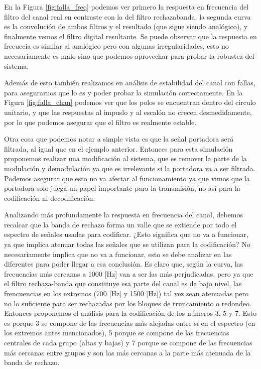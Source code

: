 En la Figura \ref{fig:falla_freq} podemos ver primero la respuesta en frecuencia del filtro del canal real en contraste con la del filtro rechazabanda, la segunda curva es la convolución de ambos filtros y el resultado (que sigue siendo analógico), y finalmente vemos el filtro digital resultante. Se puede observar que la respuesta en frecuecia es similar al analógico pero con algunas irregularidades, esto no necesariamente es malo sino que podemos aprovechar para probar la robustez del sistema.

\pagebreak

Además de esto también realizamos en análisis de estabilidad del canal con fallas, para asegurarnos que lo es y poder probar la simulación correctamente. En la Figura \ref{fig:falla_chan} podemos ver que los polos se encuentran dentro del circulo unitario, y que las respuestas al impuslo y al escalón no crecen desmedidamente, por lo que podemos asegurar que el filtro es realmente estable.

Otra cosa que podemos notar a simple vista es que la señal portadora será filtrada, al igual que en el ejemplo anterior. Entonces para esta simulación proponemos realizar una modificación al sistema, que es remover la parte de la modulación y demodulación ya que es irrelevante si la portadora va a ser filtrada. Podemos asegurar que esto no va afectar al funcionamiento ya que vimos que la portadora solo juega un papel importante para la transmisión, no así para la codificación ni decodificación.

Analizando más profundamente la respuesta en frecuencia del canal, debemos recalcar que la banda de rechazo forma un valle que se extiende por todo el espectro de señales usadas para codificar. ¿Esto significa que no va a funcionar, ya que implica atenuar todas las señales que se utilizan para la codificación? No necesariamente implica que no va a funcionar, esto se debe analizar en las diferentes para poder llegar a esa conclusión. Es claro que, según la curva, las frecuencias más cercanas a 1000 [Hz] van a ser las más perjudicadas, pero ya que el filtro rechaza-banda que constituye esa parte del canal es de bajo nivel, las frencuencias en los extremos (700 [Hz] y 1500 [Hz]) tal vez sean atenuadas pero no lo suficiente para ser rechazadas por los bloques de truncamiento o redondeo. Entonces proponemos el análisis para la codificación de los números 3, 5 y 7. Esto es porque 3 se compone de las frecuencias más alejadas entre sí en el espectro (en los extremos antes mencionados), 5 porque se compone de las frecuencias centrales de cada grupo (altas y bajas) y 7 porque se compone de las frecuencias más cercanas entre grupos y son las más cercanas a la parte más atenuada de la banda de rechazo.

